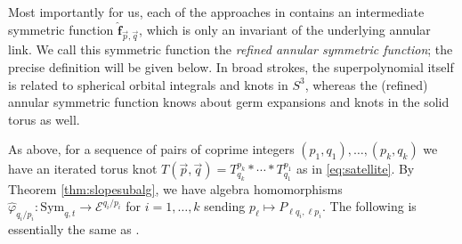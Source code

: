 \documentclass{amsart}
\numberwithin{equation}{section}
\theoremstyle{definition}
\def\hat{\widehat}
\def\Sym{{\mathrm{Sym}}}
\newcommand{\cE}{\mathcal{E}}
\newcommand{\fqrs}{\hat{\mathbf{f}}_{\vec{p},\vec{q}}}
\begin{document}


Most importantly for us, each of the approaches in \cite{GN,CD,MS} contains an intermediate symmetric function $\fqrs$, which is only an invariant of the underlying annular link. We call this symmetric function the {\em refined annular symmetric function}; the precise definition will be given below. In broad strokes, the superpolynomial itself is related to spherical orbital integrals and knots in $S^3$, whereas the (refined) annular symmetric function knows about germ expansions and knots in the solid torus as well.  %

As above, for a sequence of pairs of coprime integers $(p_1,q_1),\ldots, (p_k,q_k)$ we have an iterated torus knot $T(\vec{p},\vec{q})=T_{q_k}^{p_k}*\cdots*T_{q_1}^{p_1}$ as in \eqref{eq:satellite}. By Theorem \ref{thm:slopesubalg}, we have algebra homomorphisms $\widehat{\varphi}_{q_i/p_i}: \Sym_{q,t} \to \cE^{q_i/p_i}$ for $i=1,\ldots,k$ sending $p_\ell \mapsto P_{\ell q_i, \ell p_i}$. %
The following is essentially the same as \cite[Definition 7.15]{MS}.
\end{document}
